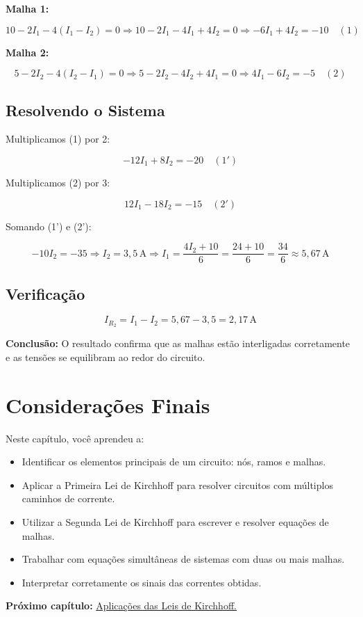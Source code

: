 \textbf{Malha 1:}

\[
10 - 2I_1 - 4(I_1 - I_2) = 0 \Rightarrow 10 - 2I_1 - 4I_1 + 4I_2 = 0
\Rightarrow -6I_1 + 4I_2 = -10 \quad (1)
\]

\textbf{Malha 2:}

\[
5 - 2I_2 - 4(I_2 - I_1) = 0 \Rightarrow 5 - 2I_2 - 4I_2 + 4I_1 = 0
\Rightarrow 4I_1 - 6I_2 = -5 \quad (2)
\]

\subsection{Resolvendo o Sistema}

Multiplicamos (1) por 2:

\[
-12I_1 + 8I_2 = -20 \quad (1')
\]

Multiplicamos (2) por 3:

\[
12I_1 - 18I_2 = -15 \quad (2')
\]

Somando (1') e (2'):

\[
-10I_2 = -35 \Rightarrow I_2 = 3{,}5\,\text{A}
\Rightarrow I_1 = \frac{4I_2 + 10}{6} = \frac{24 + 10}{6} = \frac{34}{6} \approx 5{,}67\,\text{A}
\]

\subsection{Verificação}

\[
I_{R_2} = I_1 - I_2 = 5{,}67 - 3{,}5 = 2{,}17\,\text{A}
\]

\textbf{Conclusão:} O resultado confirma que as malhas estão interligadas corretamente e as tensões se equilibram ao redor do circuito.

\section{Considerações Finais}

Neste capítulo, você aprendeu a:

\begin{itemize}
    \item Identificar os elementos principais de um circuito: nós, ramos e malhas.
    \item Aplicar a Primeira Lei de Kirchhoff para resolver circuitos com múltiplos caminhos de corrente.
    \item Utilizar a Segunda Lei de Kirchhoff para escrever e resolver equações de malhas.
    \item Trabalhar com equações simultâneas de sistemas com duas ou mais malhas.
    \item Interpretar corretamente os sinais das correntes obtidas.
\end{itemize}

\vspace{0.5cm}
\noindent\textbf{Próximo capítulo:} \hyperref[cap8]{Aplicações das Leis de Kirchhoff.}

